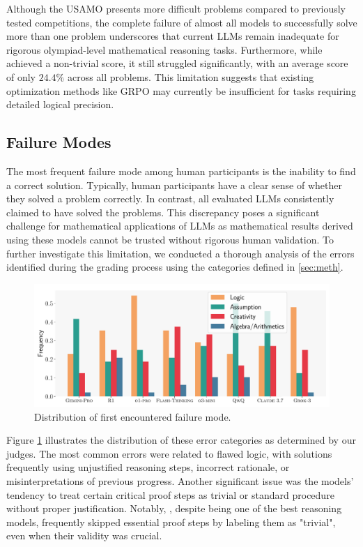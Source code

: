 Although the USAMO presents more difficult problems compared to previously tested competitions, the complete failure of almost all models to successfully solve more than one problem underscores that current LLMs remain inadequate for rigorous olympiad-level mathematical reasoning tasks. Furthermore, while \geminipro{} achieved a non-trivial score, it still struggled significantly, with an average score of only $24.4\%$ across all problems. This limitation suggests that existing optimization methods like GRPO \citep{grpo} may currently be insufficient for tasks requiring detailed logical precision.

\subsection{Failure Modes}\label{subsec:failure_modes}
The most frequent failure mode among human participants is the inability to find a correct solution. Typically, human participants have a clear sense of whether they solved a problem correctly. In contrast, all evaluated LLMs consistently claimed to have solved the problems. This discrepancy poses a significant challenge for mathematical applications of LLMs as mathematical results derived using these models cannot be trusted without rigorous human validation. To further investigate this limitation, we conducted a thorough analysis of the errors identified during the grading process using the categories defined in \cref{sec:meth}.
\begin{figure}[t]
    \centering
    \includegraphics[width=0.9\linewidth]{figures/errors.pdf}
    \vspace{-4mm}
    \caption{Distribution of first encountered failure mode.}
    \vspace{-2mm}
    \label{fig:errors}
\end{figure}

Figure \ref{fig:errors} illustrates the distribution of these error categories as determined by our judges. The most common errors were related to flawed logic, with solutions frequently using unjustified reasoning steps, incorrect rationale, or misinterpretations of previous progress. Another significant issue was the models' tendency to treat certain critical proof steps as trivial or standard procedure without proper justification. Notably, \othree{}, despite being one of the best reasoning models, frequently skipped essential proof steps by labeling them as "trivial", even when their validity was crucial.

